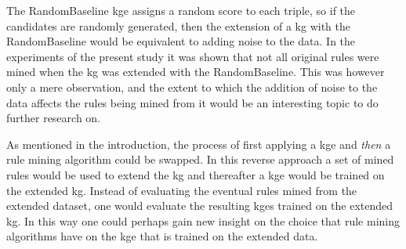 The RandomBaseline \gls{kge} assigns a random score to each triple, so if the candidates are randomly generated, then the extension of a \gls{kg} with the RandomBaseline would be equivalent to adding noise to the data. In the experiments of the present study it was shown that not all original rules were mined when the \gls{kg} was extended with the RandomBaseline. This was however only a mere observation, and the extent to which the addition of noise to the data affects the rules being mined from it would be an interesting topic to do further research on.

As mentioned in the introduction, the process of first applying a \gls{kge} and \textit{then} a rule mining algorithm could be swapped. In this reverse approach a set of mined rules would be used to extend the \gls{kg} and thereafter a \gls{kge} would be trained on the extended \gls{kg}. Instead of evaluating the eventual rules mined from the extended dataset, one would evaluate the resulting \glspl{kge} trained on the extended \gls{kg}. In this way one could perhaps gain new insight on the choice that rule mining algorithms have on the \gls{kge} that is trained on the extended data.